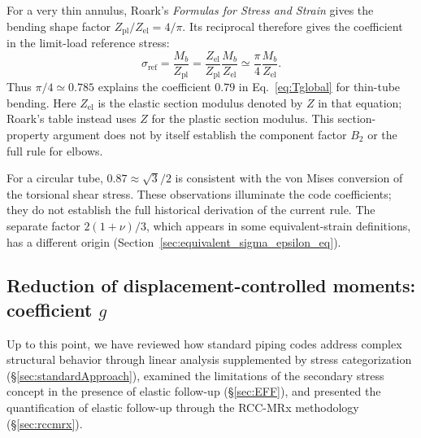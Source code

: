 \documentclass[10pt,a4paper]{article}
\begin{document}
For a very thin annulus, Roark's \emph{Formulas for Stress and Strain} \cite[Table~A.1, case~17, p.~807]{YoungBudynas2002} gives the bending shape factor $Z_{\mathrm{pl}}/Z_{\mathrm{el}}=4/\pi$. Its reciprocal therefore gives the coefficient in the limit-load reference stress:
\begin{equation*}
\sigma_{\mathrm{ref}}
=\frac{M_b}{Z_{\mathrm{pl}}}
=\frac{Z_{\mathrm{el}}}{Z_{\mathrm{pl}}}\frac{M_b}{Z_{\mathrm{el}}}
\simeq\frac{\pi}{4}\frac{M_b}{Z_{\mathrm{el}}}.
\end{equation*}
Thus $\pi/4\simeq0.785$ explains the coefficient $0.79$ in Eq.~\eqref{eq:Tglobal} for thin-tube bending. Here $Z_{\mathrm{el}}$ is the elastic section modulus denoted by $Z$ in that equation; Roark's table instead uses $Z$ for the plastic section modulus. This section-property argument does not by itself establish the component factor $B_2$ or the full rule for elbows.

For a circular tube, $0.87\approx\sqrt{3}/2$ is consistent with the von Mises conversion of the torsional shear stress. These observations illuminate the code coefficients; they do not establish the full historical derivation of the current rule. The separate factor $2(1+\nu)/3$, which appears in some equivalent-strain definitions, has a different origin (Section~\ref{sec:equivalent_sigma_epsilon_eq}).

\FloatBarrier

\newpage

\subsection{Reduction of displacement-controlled moments: coefficient $g$}
Up to this point, we have reviewed how standard piping codes address complex structural behavior through linear analysis supplemented by stress categorization (§\ref{sec:standardApproach}), examined the limitations of the secondary stress concept in the presence of elastic follow-up (§\ref{sec:EFF}), and presented the quantification of elastic follow-up through the RCC-MRx methodology (§\ref{sec:rccmrx}).
\end{document}
